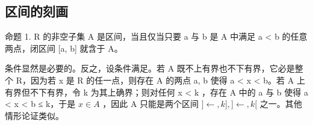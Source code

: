 \subsection{区间的刻画}

命题 1. R 的非空子集 A 是区间，当且仅当只要 a 与 b 是 A 中满足 a \textless{} b 的任意两点，闭区间 {[}a, b{]} 就含于 A。

条件显然是必要的。反之，设条件满足。若 A 既不上有界也不下有界，它必是整个 R，因为若 x 是 R 的任一点，则存在 A 的两点 a, b 使得 a \textless{} x \textless{} b。若 A 上有界但不下有界，令 k 为其上确界；则对任何 x \textless{} k ，存在 A 中的 a 与 b 使得 a \textless{} x \textless{} b ≤ k，于是 \(x \in A\) ，因此 A 只能是两个区间 \(] \leftarrow, k],] \leftarrow, k[\) 之一。其他情形论证类似。

